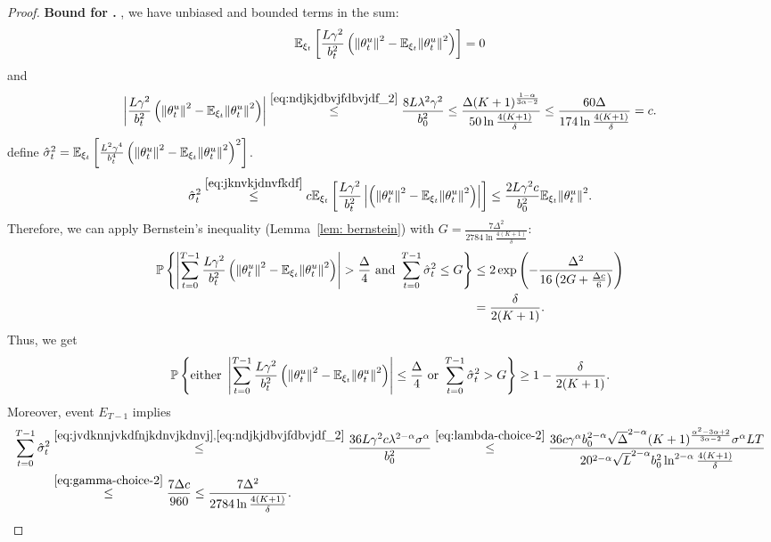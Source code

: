 \documentclass{article}
\begin{document}
\begin{proof}
    
    \textbf{Bound for \circledThree.} , we have unbiased and bounded terms in the sum:
    \begin{align*}
        {\mathbb E}_{\xi_t}\left[\frac{L\gamma^2}{b_t^2}\left({\left\lVert\theta_t^u\right\rVert}^2 - {\mathbb E}_{\xi_t}{\left\lVert\theta_t^u\right\rVert}^2\right)\right] = 0
    \end{align*}
    and
    \begin{align}
        \left|\frac{L\gamma^2}{b_t^2}\left({\left\lVert\theta_t^u\right\rVert}^2 - {\mathbb E}_{\xi_t}{\left\lVert\theta_t^u\right\rVert}^2\right)\right| \overset{\eqref{eq:ndjkjdbvjfdbvjdf_2}}{\leq} \frac{8L\lambda^2\gamma^2}{b_0^2} \leq \frac{\Delta(K+1)^{\frac{1 - \alpha}{3\alpha - 2}}}{50 \ln\frac{4(K+1)}{\delta}} \leq \frac{60\Delta}{174 \ln\frac{4(K+1)}{\delta}} = c. \label{eq:jknvkjdnvfkdf}
    \end{align}
     define $\hat{\sigma}_t^2 =  {\mathbb E}_{\xi_t}\left[\frac{L^2\gamma^4}{b_t^4}\left({\left\lVert\theta_t^u\right\rVert}^2 - {\mathbb E}_{\xi_t}{\left\lVert\theta_t^u\right\rVert}^2\right)^2\right]$.  
    \begin{align}
        \hat{\sigma}_t^2 \overset{\eqref{eq:jknvkjdnvfkdf}}{\leq} c {\mathbb E}_{\xi_t}\left[\frac{L\gamma^2}{b_t^2}\left|\left({\left\lVert\theta_t^u\right\rVert}^2 - {\mathbb E}_{\xi_t}{\left\lVert\theta_t^u\right\rVert}^2\right)\right|\right] \leq \frac{2L\gamma^2c}{b_0^2}{\mathbb E}_{\xi_t}{\left\lVert\theta_t^u\right\rVert}^2.\label{eq:jvdknnjvkdfnjkdnvjkdnvj}
    \end{align}
    Therefore, we can apply Bernstein's inequality (Lemma~\ref{lem: bernstein}) with $G = \frac{7\Delta^2}{2784\ln\frac{4(K+1)}{\delta}}$:
    \begin{align*}
        \mathbb{P}\left\{\left| \sum\limits_{t=0}^{T-1}\frac{L\gamma^2}{b_t^2}\left({\left\lVert\theta_t^u\right\rVert}^2 - {\mathbb E}_{\xi_t}{\left\lVert\theta_t^u\right\rVert}^2\right)\right| > \frac{\Delta}{4} \text{ and } \sum\limits_{t=0}^{T-1} \hat{\sigma}_t^2 \leq G\right\} &\leq 2\exp\left(-\frac{\Delta^2}{16\left(2G + \frac{\Delta c}{6}\right)}\right) \\&= \frac{\delta}{2(K+1)}.
    \end{align*}
    Thus, we get
    \begin{align*}
        \mathbb{P}\left\{\text{either }\left|\sum\limits_{t=0}^{T-1}\frac{L\gamma^2}{b_t^2}\left({\left\lVert\theta_t^u\right\rVert}^2 - {\mathbb E}_{\xi_t}{\left\lVert\theta_t^u\right\rVert}^2\right)\right| \leq \frac{\Delta}{4} \text{ or } \sum\limits_{t=0}^{T-1} \hat{\sigma}_t^2 > G\right\} \geq 1 - \frac{\delta}{2(K+1)}.
    \end{align*}
    Moreover, event $E_{T-1}$ implies
    \begin{align*}
        \sum\limits_{t=0}^{T-1}\hat{\sigma}_t^2 &\overset{\eqref{eq:jvdknnjvkdfnjkdnvjkdnvj}, \eqref{eq:ndjkjdbvjfdbvjdf_2}}{\leq} \frac{36L\gamma^2c\lambda^{2 - \alpha}\sigma^\alpha}{b_0^2} \overset{\eqref{eq:lambda-choice-2}}{\leq} \frac{36c\gamma^\alpha b_0^{2-\alpha}\sqrt{\Delta}^{2-\alpha}(K+1)^{\frac{\alpha^2 - 3\alpha +2}{3\alpha -2}}\sigma^\alpha LT}{20^{2-\alpha}\sqrt{L}^{2 - \alpha}b_0^2 \ln^{2-\alpha}\frac{4(K+1)}{\delta}} \\
        &\overset{\eqref{eq:gamma-choice-2}}{\leq} \frac{7\Delta c}{960} \leq \frac{7\Delta^2}{2784\ln\frac{4(K+1)}{\delta}}.
    \end{align*}


\end{proof}
\end{document}
